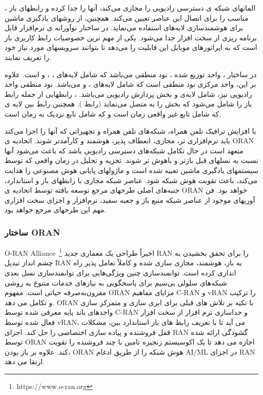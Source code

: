 ،
 المانهای شبکه ی دسترسی رادیویی را مجازی می‌کند، آنها را جدا کرده و رابطهای باز مناسب را 
برای اتصال این عناصر
تعیین می‌کند. همچنین، 
از روشهای یادگیری ماشین برای هوشمندسازی لایه‌های 
 استفاده می‌نماید. 
 در ساختار نوآورانه ی 
 نرم‌افزار قابل برنامه ریزی 
 از سخت افزار جدا می‌شود.
  یکی از مهم ترین خصوصیات
  رابط کاربری باز است که به اپراتورهای موبایل این قابلیت را می‌دهد تا بتوانند سرویسهای مورد نیاز خود را تعریف نمایند.

در ساختار
،
واحد توزیع شده ،
نود منطقی می‌باشد که شامل لایه‌های 
،
،
و
است.
علاوه بر این، واحد مرکزی 
نود منطقی است که شامل لایه‌های 
،
و 
می‌باشد.
نود منطقی واحد رادیویی
نیز، شامل لایه‌ی 
و بخش پردازش رادیویی می‌باشد.
،
رابطهایی از جمله رابط 
باز را شامل می‌شود که بخش  را به  متصل می‌نماید
(رابط 
). 
همچنین
 رابط 
 بین لایه ی 
  که شامل 
  تابع غیر واقعی زمان است و 
  که شامل تابع نزدیک به زمان است. 


  با افزایش ترافیک تلفن همراه، شبکه‌های تلفن همراه و تجهیزاتی که آنها را اجرا می‌کند باید نرم‌افزاری تر، مجازی، انعطاف پذیر، هوشمند و کارآمدتر شوند.
اتحادیه ی ORAN متعهد است در حال تکامل شبکه‌های دسترسی رادیویی باشد که باعث می‌شود آنها نسبت به نسلهای قبل بازتر و باهوش تر شوند.
تجزیه و تحلیل در زمان واقعی که توسط سیستمهای یادگیری ماشین تعبیه شده است و ماژولهای پایانی هوش مصنوعی را هدایت می‌کند، باعث تقویت هوش شبکه ‌‌شود.
عناصر شبکه مجازی با رابطهای باز و استاندارد، جنبه‌های اصلی طرحهای مرجع توسعه یافته توسط اتحادیه ی ORAN خواهد بود.
فن آوریهای موجود از عناصر شبکه منبع باز و جعبه سفید، نرم‌افزار و اجزای سخت افزاری مهم این طرحهای مرجع خواهد بود.

\subsubsection{ساختار ORAN}
O-RAN Alliance~\footnote{https://www.o-ran.org} اخیراً طراحی یک معماری جدید
 RAN را برای تحقق بخشیدن به چشم انداز تبدیل RAN به باز، هوشمند، مجازی سازی شده و کاملاً تعامل پذیر راه اندازی کرده است. توانمندسازی چنین ویژگی‌هایی برای توانمندسازی نسل بعدی شبکه‌های سلولی بی‌سیم برای پاسخگویی به نیازهای خدمات متنوع به روشی مقرون‌به‌صرفه حیاتی است. مفهوم ORAN مزایای مفاهیم C-RAN و vRAN را ترکیب و تکامل می دهد. ORAN با تکیه بر تلاش های قبلی برای ابری سازی و متمرکز سازی واحدهای باند پایه معرفی شده توسط C-RAN و جداسازی نرم افزار از سخت افزار فعال شده توسط vRAN، می آید تا با تعریف رابط های باز استاندارد بین، مشکلات قفل فروشنده و پیاده سازی اختصاصی را حل کند. اجزای RAN گشودگی ارائه شده توسط ORAN اجازه می دهد تا یک اکوسیستم زنجیره تامین با چند فروشنده را تقویت کند. علاوه بر باز بودن، ORAN هوش شبکه را از طریق ادغام AI/ML در اجزای RAN ارتقا می دهد.
 
